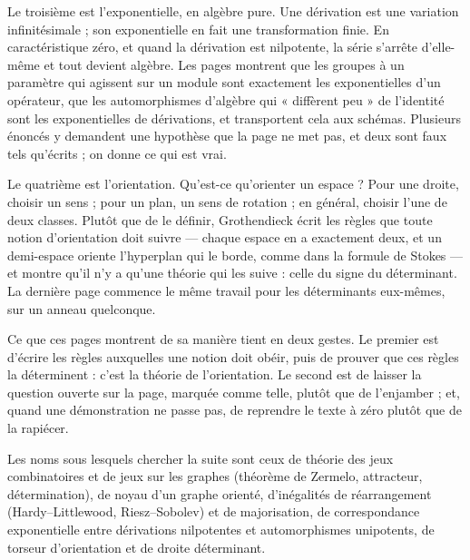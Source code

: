 \documentclass[11pt,a4paper]{article}
\begin{document}
\begin{resume}
Le troisième est l'exponentielle, en algèbre pure. Une dérivation est une
variation infinitésimale ; son exponentielle en fait une transformation
finie. En caractéristique zéro, et quand la dérivation est nilpotente, la série
s'arrête d'elle-même et tout devient algèbre. Les pages montrent que les
groupes à un paramètre qui agissent sur un module sont exactement les
exponentielles d'un opérateur, que les automorphismes d'algèbre qui
« diffèrent peu » de l'identité sont les exponentielles de dérivations, et
transportent cela aux schémas. Plusieurs énoncés y demandent une hypothèse
que la page ne met pas, et deux sont faux tels qu'écrits ; on donne ce qui
est vrai.

Le quatrième est l'orientation. Qu'est-ce qu'orienter un espace ? Pour une
droite, choisir un sens ; pour un plan, un sens de rotation ; en général,
choisir l'une de deux classes. Plutôt que de le définir, Grothendieck écrit
les règles que toute notion d'orientation doit suivre --- chaque espace en a
exactement deux, et un demi-espace oriente l'hyperplan qui le borde, comme
dans la formule de Stokes --- et montre qu'il n'y a qu'une théorie qui les
suive : celle du signe du déterminant. La dernière page commence le même
travail pour les déterminants eux-mêmes, sur un anneau quelconque.

Ce que ces pages montrent de sa manière tient en deux gestes. Le premier est
d'écrire les règles auxquelles une notion doit obéir, puis de prouver que ces
règles la déterminent : c'est la théorie de l'orientation. Le second est de
laisser la question ouverte sur la page, marquée comme telle, plutôt que de
l'enjamber ; et, quand une démonstration ne passe pas, de reprendre le texte à
zéro plutôt que de la rapiécer.

Les noms sous lesquels chercher la suite sont ceux de théorie des jeux
combinatoires et de jeux sur les graphes (théorème de Zermelo, attracteur,
détermination), de noyau d'un graphe orienté, d'inégalités de réarrangement
(Hardy--Littlewood, Riesz--Sobolev) et de majorisation, de correspondance
exponentielle entre dérivations nilpotentes et automorphismes unipotents, de
torseur d'orientation et de droite déterminant.

\end{resume}
\end{document}
